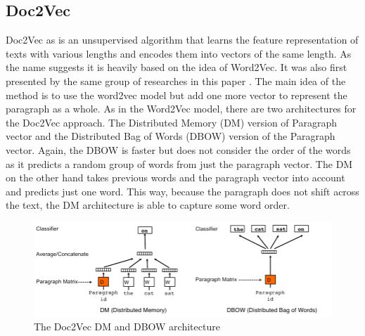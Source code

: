 \subsection{Doc2Vec}
Doc2Vec as is an unsupervised algorithm that learns the feature representation of texts with various lengths and encodes them into vectors of the same length. As the name suggests it is heavily based on the idea of Word2Vec. It was also first presented by the same group of researches in this paper \cite{DBLP:journals/corr/LeM14}. The main idea of the method is to use the word2vec model but add one more vector to represent the paragraph as a whole. As in the Word2Vec model, there are two architectures for the Doc2Vec approach. The Distributed Memory (DM) version of Paragraph vector and the Distributed Bag of Words (DBOW) version of the Paragraph vector. Again, the DBOW is faster but does not consider the order of the words as it predicts a random group of words from just the paragraph vector. The DM on the other hand takes previous words and the paragraph vector into account and predicts just one word. This way, because the paragraph does not shift across the text, the DM architecture is able to capture some word order.
\begin{figure}[h]
    \centering
	\includegraphics[width=140mm]{./img/DV_DBOW_doc2vec_architectures.png}
	\caption{The Doc2Vec DM and DBOW architecture}
	\label{fig:dbow_dm_d2v_architecture}
\end{figure}
